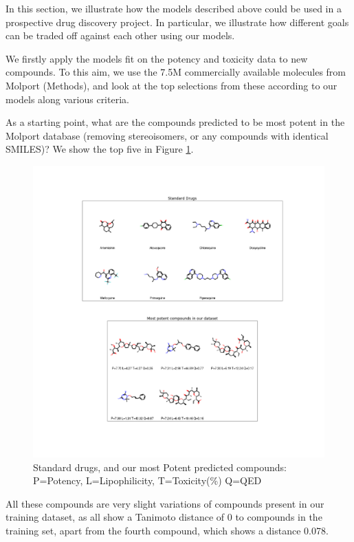 \documentclass[journal=jacsat,manuscript=article]{achemso}
\begin{document}
In this section, we illustrate how the models described above could be used in a prospective drug discovery project. In particular, we illustrate how different goals can be traded off against each other using our models.

We firstly apply the models fit on the potency and toxicity data to new compounds.  To this aim, we use the 7.5M commercially available molecules from Molport (Methods), and look at the top selections from these according to our models along various criteria.

As a starting point, what are the compounds predicted to be most potent in the Molport database (removing stereoisomers, or any compounds with identical 
SMILES)?  We show the top five in Figure \ref{fig:mostpot}.

\begin{figure}[h!]
\centering
\includegraphics[width=\textwidth]{fig6_drugs_n_pot.png}
\caption{Standard drugs, and our most Potent predicted compounds: P=Potency, L=Lipophilicity, T=Toxicity(\%) Q=QED}
\label{fig:mostpot}
\end{figure}


All these compounds are very slight variations of compounds present in our training dataset, as all show a Tanimoto distance of 0 to compounds in the training set, apart from the fourth compound, which shows a distance 0.078.  
\end{document}
